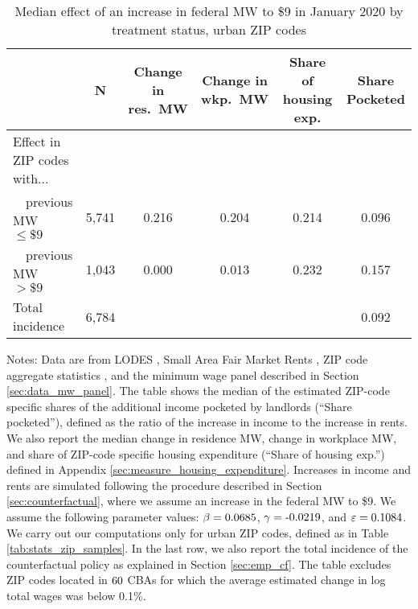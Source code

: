 \begin{table}[hbt!]
    \centering
    \caption{Median effect of an increase in federal MW to \$9 in January 2020
             by treatment status, urban ZIP codes}
    \label{tab:counterfactuals_fed_9usd}

    \begin{tabular}{@{}lccccc@{}}
        \toprule
                         & N & \shortstack{Change in\\res.\ MW}
                             & \shortstack{Change in\\wkp.\ MW}
                             & \shortstack{Share of\\housing exp.}  
                             & \shortstack{Share\\Pocketed}                      \\ \midrule
        Effect in ZIP codes with...          &      &       &       &     &      \\
        $\quad$previous MW $\leq\$9\quad$    & 5,741 &  0.216 & 0.204  & 0.214 &  0.096   \\
        $\quad$previous MW $>\$9\quad$       & 1,043 &  0.000 & 0.013  & 0.232 & 0.157    \\ 
        Total incidence                      & 6,784 &      &      &     & 0.092    \\ \bottomrule
    \end{tabular}
    
    \begin{minipage}{.95\textwidth} \footnotesize
        \vspace{2mm}
        Notes: 
        Data are from LODES \parencite{CensusLODES}, 
        Small Area Fair Market Rents \parencite{hudSAFMR},
        ZIP code aggregate statistics \parencite{IRS}, and
        the minimum wage panel described in Section \ref{sec:data_mw_panel}.
        The table shows the median of the estimated ZIP-code specific shares of 
        the additional income pocketed by landlords (``Share pocketed''), 
        defined as the ratio of the increase in income to the increase in rents. 
        We also report the median change in residence MW, change in workplace MW,
        and share of ZIP-code specific housing expenditure 
        (``Share of housing exp.'') defined in Appendix 
        \ref{sec:measure_housing_expenditure}.
        Increases in income and rents are simulated following the procedure 
        described in Section \ref{sec:counterfactual},
        where we assume an increase in the federal MW to \$9.
        We assume the following parameter values: 
        $\beta = \textnormal{0.0685}$, $\gamma = \textnormal{-0.0219}$, and $\varepsilon = \textnormal{0.1084}$.
        We carry out our computations only for urban ZIP codes, defined as 
        in Table \ref{tab:stats_zip_samples}.
        In the last row, we also report the total incidence of the counterfactual 
        policy as explained in Section \ref{sec:emp_cf}.
        The table excludes ZIP codes located in $\textnormal{60}$ CBAs for 
        which the average estimated change in log total wages was below 0.1\%.
    \end{minipage}
\end{table}


